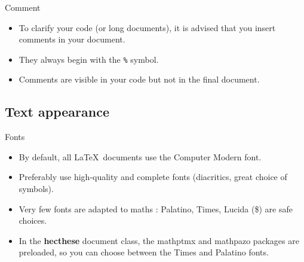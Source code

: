 \begin{frame}[c]{Comment}
	\begin{itemize}
		\item To clarify your code (or long documents), it is advised that
			you insert comments in your document.
		\item They always begin with the \texttt{\%} symbol.
		\item Comments are visible in your code but not in the final document.
	\end{itemize}
\end{frame}

\subsection{Text appearance}

\begin{frame}[c]{Fonts}
	\begin{itemize}
		\item By default, all \LaTeX\ documents use the \textrm{Computer Modern} font.
		\item Preferably use high-quality and complete fonts (diacritics, great choice of symbols).
		\item Very few fonts are adapted to maths : Palatino, Times, Lucida (\$) are safe choices.
		\item In the \textbf{hecthese} document class, the mathptmx and mathpazo packages are preloaded,
			so you can choose between the Times and Palatino fonts.
	\end{itemize}
\end{frame}

